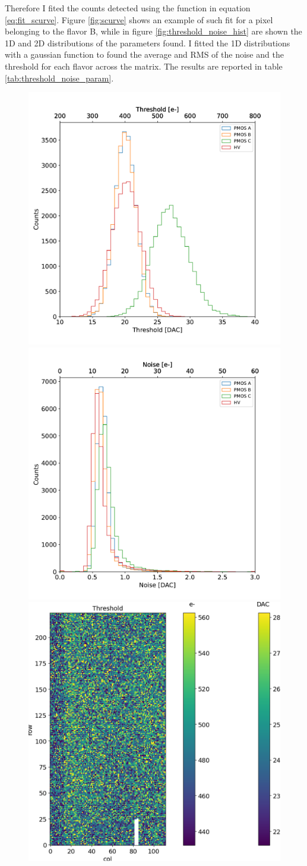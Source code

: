         Therefore I fited the counts detected using the function in equation \ref{eq:fit_scurve}. Figure \ref{fig:scurve} shows an example of such fit for a pixel belonging to the flavor B, while in figure \ref{fig:threshold_noise_hist} are shown the 1D and 2D distributions of the parameters found. I fitted the 1D distributions with a gaussian function to found the average and RMS of the noise and the threshold for each flavor across the matrix. The results are reported in table \ref{tab:threshold_noise_param}.
        \begin{figure}[h!]
            \centering
            \includegraphics[width=.49\linewidth]{figures/charaterization/threshold_histogram.pdf}
            \includegraphics[width=.49\linewidth]{figures/charaterization/noise_histogram.pdf}\\
            \includegraphics[width=.49\linewidth]{figures/charaterization/threshold_map.pdf}

\end{figure}
